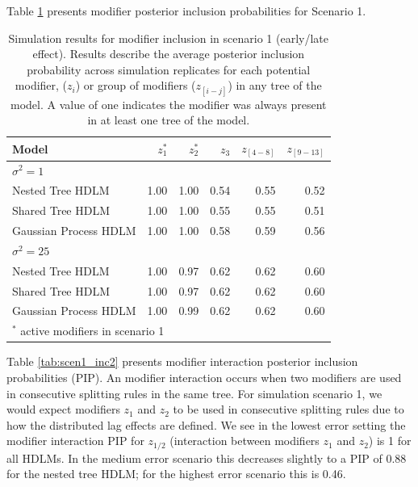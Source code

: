 \documentclass[12pt]{article}
\begin{document}
Table \ref{tab:scen1_inc} presents modifier posterior inclusion probabilities for Scenario 1.

\begin{table}[!ht]
 \footnotesize
    \centering
    \caption{Simulation results for modifier inclusion in scenario 1 (early/late effect). Results describe the average posterior inclusion probability across simulation replicates for each potential modifier, ($z_i$) or group of modifiers ($z_{[i-j]}$) in any tree of the model. A value of one indicates the modifier was always present in at least one tree of the model.}
    \label{tab:scen1_inc}
    \begin{tabular}{lrrrrr}
        \toprule[2pt]
        Model & $z_{1}^*$ & $z_{2}^*$ & $z_{3}$ & $z_{[4-8]}$ & $z_{[9-13]}$ \\
        
        
        \midrule
        \multicolumn{6}{l}{$\sigma^2=1$}\\
Nested Tree HDLM & 1.00 & 1.00 & 0.54 & 0.55 & 0.52\\
Shared Tree HDLM & 1.00 & 1.00 & 0.55 & 0.55 & 0.51\\
Gaussian Process HDLM & 1.00 & 1.00 & 0.58 & 0.59 & 0.56\\
    
        \midrule
        \multicolumn{6}{l}{$\sigma^2=25$}\\
Nested Tree HDLM & 1.00 & 0.97 & 0.62 & 0.62 & 0.60\\
Shared Tree HDLM & 1.00 & 0.97 & 0.62 & 0.62 & 0.60\\
Gaussian Process HDLM & 1.00 & 0.99 & 0.62 & 0.62 & 0.60\\

        \bottomrule[2pt]
        \multicolumn{6}{l}{$^*$ active modifiers in scenario 1}\\
    \end{tabular}
\end{table}



Table \ref{tab:scen1_inc2} presents modifier interaction posterior inclusion probabilities (PIP). An modifier interaction occurs when two modifiers are used in consecutive splitting rules in the same tree. For simulation scenario 1, we would expect modifiers $z_1$ and $z_2$ to be used in consecutive splitting rules due to how the distributed lag effects are defined. We see in the lowest error setting the modifier interaction PIP for $z_{1/2}$ (interaction between modifiers $z_1$ and $z_2$) is 1 for all HDLMs. In the medium error scenario this decreases slightly to a PIP of 0.88 for the nested tree HDLM; for the highest error scenario this is 0.46. 
\end{document}
